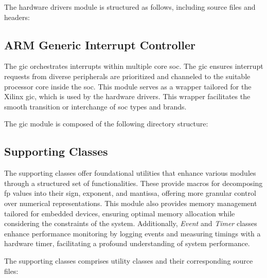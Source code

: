 The hardware drivers module is structured as follows, including source files and headers:
\begin{figure}[!h]
\end{figure}
\FloatBarrier


\subsection {ARM Generic Interrupt Controller}
The \gls{gic} orchestrates interrupts within multiple core \gls{soc}. The \gls{gic} ensures interrupt requests from diverse peripherals are prioritized and channeled to the suitable processor core inside the \gls{soc}. This module serves as a wrapper tailored for the Xilinx \gls{gic}, which is used by the hardware drivers. This wrapper facilitates the smooth transition or interchange of \gls{soc} types and brands.

The \gls{gic} module is composed of the following directory structure:
\begin{figure}[!h]
\end{figure}
\FloatBarrier

\subsection {Supporting Classes}
The supporting classes offer foundational utilities that enhance various modules through a structured set of functionalities. These provide macros for decomposing \gls{fp} values into their sign, exponent, and mantissa, offering more granular control over numerical representations. This module also provides memory management tailored for embedded devices, ensuring optimal memory allocation while considering the constraints of the system. Additionally, \textit{Event} and \textit{Timer} classes enhance performance monitoring by logging events and measuring timings with a hardware timer, facilitating a profound understanding of system performance.

The supporting classes comprises utility classes and their corresponding source files:
\begin{figure}[!h]
\end{figure}
\FloatBarrier

